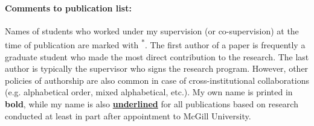 \paragraph{Comments to publication list:} 
Names of students who worked under my supervision (or co-supervision) at the time of publication are marked with \textsuperscript{*}. The first author of a paper is frequently a graduate student who made the most direct contribution to the research. The last author is typically the supervisor who signs the research program. However, other policies of authorship are also common in case of cross-institutional collaborations (e.g. alphabetical order, mixed alphabetical, etc.). My own name is printed in \textbf{bold}, while my name is also \textbf{\underline{underlined}} for all 
publications based on research conducted at least in part after appointment to McGill University.


